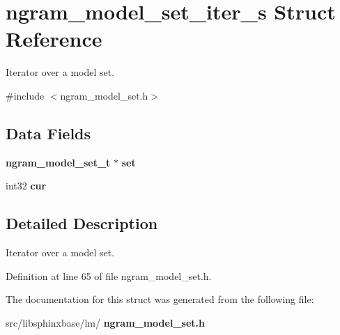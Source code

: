 \section{ngram\+\_\+model\+\_\+set\+\_\+iter\+\_\+s Struct Reference}
\label{structngram__model__set__iter__s}


Iterator over a model set.  




{\ttfamily \#include $<$ngram\+\_\+model\+\_\+set.\+h$>$}

\subsection*{Data Fields}
\begin{DoxyCompactItemize}
\item 
\mbox{\label{structngram__model__set__iter__s_ac03199d884b9ed641141a1512f87b0cc}} 
\textbf{ ngram\+\_\+model\+\_\+set\+\_\+t} $\ast$ {\bfseries set}
\item 
\mbox{\label{structngram__model__set__iter__s_afe1dd087a0beb86a29549785ab394f91}} 
int32 {\bfseries cur}
\end{DoxyCompactItemize}


\subsection{Detailed Description}
Iterator over a model set. 

Definition at line 65 of file ngram\+\_\+model\+\_\+set.\+h.



The documentation for this struct was generated from the following file\+:\begin{DoxyCompactItemize}
\item 
src/libsphinxbase/lm/\textbf{ ngram\+\_\+model\+\_\+set.\+h}\end{DoxyCompactItemize}
